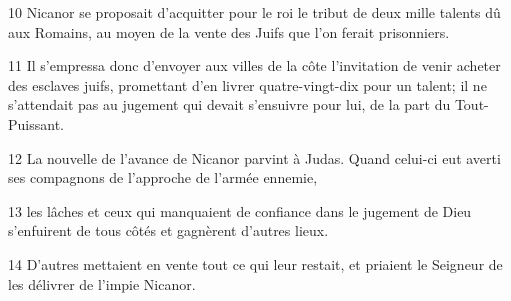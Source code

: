 10 Nicanor se proposait d’acquitter pour le roi le tribut de deux mille talents dû aux Romains, au moyen de la vente des Juifs que l’on ferait prisonniers.

11 Il s’empressa donc d’envoyer aux villes de la côte l’invitation de venir acheter des esclaves juifs, promettant d’en livrer quatre-vingt-dix pour un talent; il ne s’attendait pas au jugement qui devait s’ensuivre pour lui, de la part du Tout-Puissant.

12 La nouvelle de l’avance de Nicanor parvint à Judas. Quand celui-ci eut averti ses compagnons de l’approche de l’armée ennemie,

13 les lâches et ceux qui manquaient de confiance dans le jugement de Dieu s’enfuirent de tous côtés et gagnèrent d’autres lieux.

14 D’autres mettaient en vente tout ce qui leur restait, et priaient le Seigneur de les délivrer de l’impie Nicanor.
